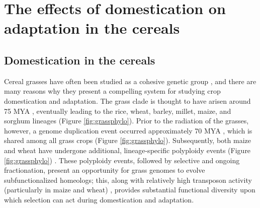 \documentclass[12pt]{article}
\begin{document}
\paragraph{}

\section*{The effects of domestication on adaptation in the cereals}

\subsection*{Domestication in the cereals}
Cereal grasses have often been studied as a cohesive genetic group \citep{pmid8379002, pmid11244100}, and there are many reasons why they present a compelling system for studying crop domestication and adaptation.
The grass clade is thought to have arisen around 75 MYA \citep{BOUCHENAKKHELLADI2010, Kellogg2001}, eventually leading to the rice, wheat, barley, millet, maize, and sorghum lineages (Figure \ref{fig:grassphylo}).
Prior to the radiation of the grasses, however, a genome duplication event occurred approximately 70 MYA \citep{Paterson2004}, which is shared among all grass crops (Figure \ref{fig:grassphylo}).
Subsequently, both maize and wheat have undergone additional, lineage-specific polyploidy events (Figure \ref{fig:grassphylo}) \citep{Levy2002}.
These polyploidy events, followed by selective and ongoing fractionation, present an opportunity for grass genomes to evolve subfunctionalized homeologs; this, along with relatively high transposon activity (particularly in maize and wheat) \citep{Wicker2016, Lisch2001}, provides substantial functional diversity upon which selection can act during domestication and adaptation.
\end{document}
